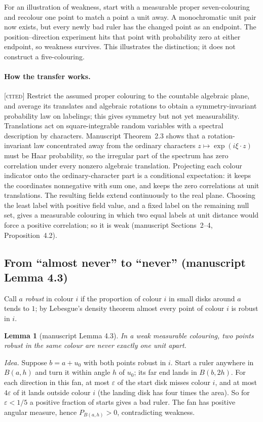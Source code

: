 \documentclass[11pt]{article}
\newtheorem{lemma}[theorem]{Lemma}
\theoremstyle{definition}
\theoremstyle{remark}
\newcommand{\st}[1]{\textsc{[#1]}}
\begin{document}
For an illustration of weakness, start with a measurable proper seven-colouring
and recolour one point to match a point a unit away. A monochromatic unit pair
now exists, but every newly bad ruler has the changed point as an endpoint.
The position--direction experiment hits that point with probability zero at
either endpoint, so weakness survives. This illustrates the distinction; it
does not construct a five-colouring.

\paragraph{How the transfer works.} \st{cited} Restrict the assumed proper colouring to the countable algebraic plane, and average its translates and algebraic rotations to obtain a symmetry-invariant probability law on labelings; this gives symmetry but not yet measurability. Translations act on square-integrable random variables with a spectral description by characters. Manuscript Theorem~2.3 shows that a rotation-invariant law concentrated away from the ordinary characters $z\mapsto\exp(i\xi\cdot z)$ must be Haar probability, so the irregular part of the spectrum has zero correlation under every nonzero algebraic translation. Projecting each colour indicator onto the ordinary-character part is a conditional expectation: it keeps the coordinates nonnegative with sum one, and keeps the zero correlations at unit translations. The resulting fields extend continuously to the real plane. Choosing the least label with positive field value, and a fixed label on the remaining null set, gives a measurable colouring in which two equal labels at unit distance would force a positive correlation; so it is weak (manuscript Sections~2--4, Proposition~4.2).

\subsection{From ``almost never'' to ``never'' (manuscript Lemma 4.3)}
Call $a$ \emph{robust} in colour $i$ if the proportion of colour $i$ in small disks around $a$ tends to $1$; by Lebesgue's density theorem almost every point of colour $i$ is robust in $i$.

\begin{lemma}[manuscript Lemma 4.3]
In a weak measurable colouring, two points robust in the same colour are never exactly one unit apart.
\end{lemma}
\noindent\emph{Idea.} Suppose $b=a+u_0$ with both points robust in $i$. Start a ruler anywhere in $B(a,h)$ and turn it within angle $h$ of $u_0$; its far end lands in $B(b,2h)$. For each direction in this fan, at most $\varepsilon$ of the start disk misses colour $i$, and at most $4\varepsilon$ of it lands outside colour $i$ (the landing disk has four times the area). So for $\varepsilon<1/5$ a positive fraction of starts gives a bad ruler. The fan has positive angular measure, hence $P_{B(a,h)}>0$, contradicting weakness.
\end{document}
